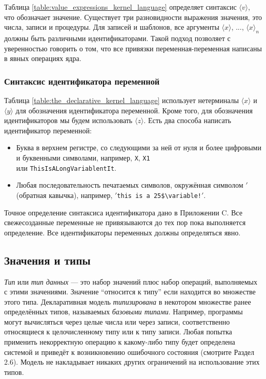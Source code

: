 Таблица \ref{table:value_expressions_kernel_language} определяет синтаксис $\langle v \rangle$, что обозначает значение. Существует три разновидности выражения значения, это числа, записи и процедуры. Для записей и шаблонов, все аргументы $\langle x \rangle$, ..., ${\langle x \rangle}_{n}$ должны быть различными идентификаторами. Такой подход позволяет с уверенностью говорить о том, что все привязки переменная-переменная написаны в явных операциях ядра.

\subsubsection{Синтаксис идентификатора переменной}

Таблица \ref{table:the_declarative_kernel_language} использует нетерминалы $\langle x \rangle$ и $\langle y \rangle$ для обозначения идентификатора переменной. Кроме того, для обозначения идентификаторов мы будем использовать $\langle z \rangle$. Есть два способа написать идентификатор переменной:

\begin{itemize}
\item{Буква в верхнем регистре, со следующими за ней от нуля и более цифровыми и буквенными символами, например, \lstinline|X|, \lstinline|X1| \\или \lstinline|ThisIsALongVariablentIt|.}

\item{Любая последовательность печатаемых символов, окружённая символом $'$ (обратная кавычка), например, $'$\verb|this is a 25$\variable!|$'$.}
\end{itemize}

Точное определение синтаксиса идентификатора дано в Приложении C. Все свежесозданные переменные не привязываются до тех пор пока выполняется определение. Все идентификаторы переменных должны определяться явно.

\subsection{Значения и типы}

\emph{Тип} или \emph{тип данных} --- это набор значений плюс набор операций, выполняемых с этими значениями. Значение ``относится к типу'' если находится во множестве этого типа. Декларативная модель \emph{типизирована} в некотором множестве ранее определённых типов, называемых \emph{базовыми типами}. Например, программы могут вычисляться через целые числа или через записи, соответственно относящиеся к целочисленному типу или к типу записи. Любая попытка применить некорректную операцию к какому-либо типу будет определена системой и приведёт к возникновению ошибочного состояния (смотрите Раздел 2.6). Модель не накладывает никаких других ограничений на использование этих типов.


